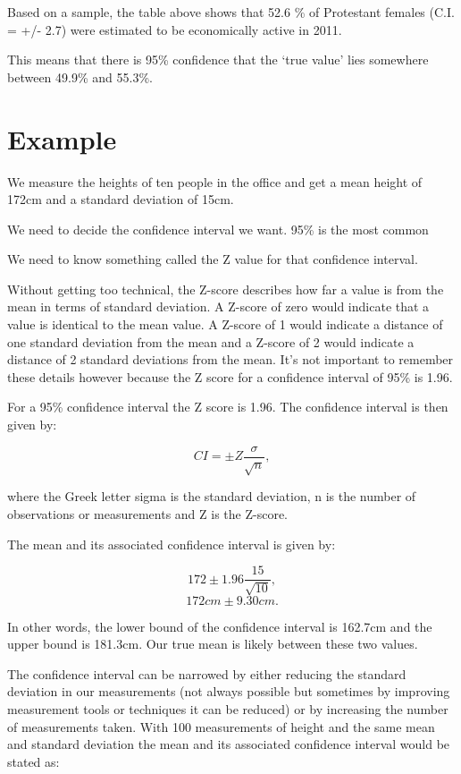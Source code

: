 \documentclass[
]{book}
\begin{document}
Based on a sample, the table above shows that 52.6 \% of Protestant females (C.I. = +/- 2.7) were estimated to be economically active in 2011.

This means that there is 95\% confidence that the `true value' lies somewhere between 49.9\% and 55.3\%.

\hypertarget{example-15}{%
\section{Example}\label{example-15}}

We measure the heights of ten people in the office and get a mean height of 172cm and a standard deviation of 15cm.

We need to decide the confidence interval we want. 95\% is the most common

We need to know something called the Z value for that confidence interval.

Without getting too technical, the Z-score describes how far a value is from the mean in terms of standard deviation. A Z-score of zero would indicate that a value is identical to the mean value. A Z-score of 1 would indicate a distance of one standard deviation from the mean and a Z-score of 2 would indicate a distance of 2 standard deviations from the mean. It's not important to remember these details however because the Z score for a confidence interval of 95\% is 1.96.

For a 95\% confidence interval the Z score is 1.96. The confidence interval is then given by:

\[CI=\pm Z \frac{\sigma}{\sqrt{n}},\]

where the Greek letter sigma is the standard deviation, n is the number of observations or measurements and Z is the Z-score.

The mean and its associated confidence interval is given by:

\[172 \pm 1.96 \frac{15}{\sqrt{10}},\]
\[172cm \pm 9.30cm.\]

In other words, the lower bound of the confidence interval is 162.7cm and the upper bound is 181.3cm. Our true mean is likely between these two values.

The confidence interval can be narrowed by either reducing the standard deviation in our measurements (not always possible but sometimes by improving measurement tools or techniques it can be reduced) or by increasing the number of measurements taken. With 100 measurements of height and the same mean and standard deviation the mean and its associated confidence interval would be stated as:
\end{document}
